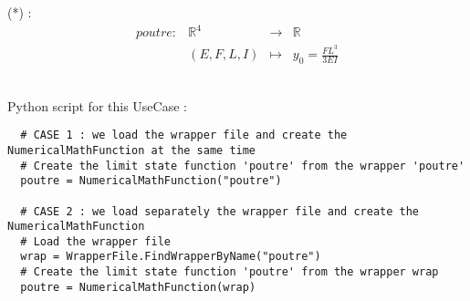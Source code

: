 (*) :
\begin{equation}
  \label{equatPoutre}
  \begin{array}{l|lcl}
    poutre : & \mathbb{R}^4 & \rightarrow & \mathbb{R} \\
    & (E,F,L,I)    & \mapsto     & y_0 = \displaystyle \frac{FL^3}{3EI}
  \end{array}
\end{equation}

\textspace\\
Python script for this UseCase :

\begin{lstlisting}
  # CASE 1 : we load the wrapper file and create the NumericalMathFunction at the same time
  # Create the limit state function 'poutre' from the wrapper 'poutre'
  poutre = NumericalMathFunction("poutre")

  # CASE 2 : we load separately the wrapper file and create the NumericalMathFunction
  # Load the wrapper file
  wrap = WrapperFile.FindWrapperByName("poutre")
  # Create the limit state function 'poutre' from the wrapper wrap
  poutre = NumericalMathFunction(wrap)
\end{lstlisting}
